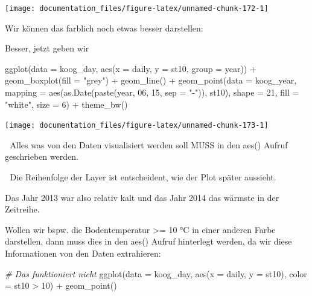 \documentclass[
]{article}
\newenvironment{Shaded}{\begin{snugshade}}{\end{snugshade}}
\newcommand{\AttributeTok}[1]{\textcolor[rgb]{0.77,0.63,0.00}{#1}}
\newcommand{\CommentTok}[1]{\textcolor[rgb]{0.56,0.35,0.01}{\textit{#1}}}
\newcommand{\DecValTok}[1]{\textcolor[rgb]{0.00,0.00,0.81}{#1}}
\newcommand{\FunctionTok}[1]{\textcolor[rgb]{0.00,0.00,0.00}{#1}}
\newcommand{\NormalTok}[1]{#1}
\newcommand{\SpecialCharTok}[1]{\textcolor[rgb]{0.00,0.00,0.00}{#1}}
\newcommand{\StringTok}[1]{\textcolor[rgb]{0.31,0.60,0.02}{#1}}
\begin{document}
\begin{center}\texttt{[image: documentation\_files/figure-latex/unnamed-chunk-172-1]} \end{center}

Wir können das farblich noch etwas besser darstellen:

Besser, jetzt geben wir

\begin{Shaded}
\begin{Highlighting}[]
\FunctionTok{ggplot}\NormalTok{(}\AttributeTok{data =}\NormalTok{ koog\_day, }\FunctionTok{aes}\NormalTok{(}\AttributeTok{x =}\NormalTok{ daily, }\AttributeTok{y =}\NormalTok{ st10, }\AttributeTok{group =}\NormalTok{ year)) }\SpecialCharTok{+}
  \FunctionTok{geom\_boxplot}\NormalTok{(}\AttributeTok{fill =} \StringTok{"grey"}\NormalTok{) }\SpecialCharTok{+}
  \FunctionTok{geom\_line}\NormalTok{() }\SpecialCharTok{+}
    \FunctionTok{geom\_point}\NormalTok{(}\AttributeTok{data =}\NormalTok{ koog\_year, }\AttributeTok{mapping =} \FunctionTok{aes}\NormalTok{(}\FunctionTok{as.Date}\NormalTok{(}\FunctionTok{paste}\NormalTok{(year, }\DecValTok{06}\NormalTok{, }\DecValTok{15}\NormalTok{, }\AttributeTok{sep =} \StringTok{"{-}"}\NormalTok{)), st10), }\AttributeTok{shape =} \DecValTok{21}\NormalTok{, }\AttributeTok{fill =} \StringTok{"white"}\NormalTok{, }\AttributeTok{size =} \DecValTok{6}\NormalTok{) }\SpecialCharTok{+}
  \FunctionTok{theme\_bw}\NormalTok{()}
\end{Highlighting}
\end{Shaded}

\begin{center}\texttt{[image: documentation\_files/figure-latex/unnamed-chunk-173-1]} \end{center}

🚨 Alles was von den Daten visualisiert werden soll MUSS in den aes() Aufruf geschrieben werden.

🚨 Die Reihenfolge der Layer ist entscheident, wie der Plot später aussieht.

Das Jahr 2013 war also relativ kalt und das Jahr 2014 das wärmste in der Zeitreihe.

Wollen wir bspw. die Bodentemperatur \textgreater= 10 °C in einer anderen Farbe darstellen, dann muss dies in den aes() Aufruf hinterlegt werden, da wir diese Informationen von den Daten extrahieren:

\begin{Shaded}
\begin{Highlighting}[]
\CommentTok{\# Das funktioniert nicht}
\FunctionTok{ggplot}\NormalTok{(}\AttributeTok{data =}\NormalTok{ koog\_day, }\FunctionTok{aes}\NormalTok{(}\AttributeTok{x =}\NormalTok{ daily, }\AttributeTok{y =}\NormalTok{ st10), }\AttributeTok{color =}\NormalTok{ st10 }\SpecialCharTok{\textgreater{}} \DecValTok{10}\NormalTok{) }\SpecialCharTok{+}
  \FunctionTok{geom\_point}\NormalTok{()}
\end{Highlighting}
\end{Shaded}
\end{document}

